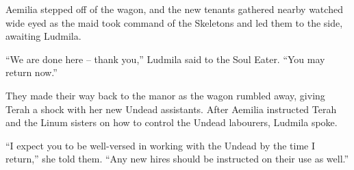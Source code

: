 Aemilia stepped off of the wagon, and the new tenants gathered nearby watched wide eyed as the maid took command of the Skeletons and led them to the side, awaiting Ludmila.

 

“We are done here – thank you,” Ludmila said to the Soul Eater. “You may return now.”

 

They made their way back to the manor as the wagon rumbled away, giving Terah a shock with her new Undead assistants. After Aemilia instructed Terah and the Linum sisters on how to control the Undead labourers, Ludmila spoke.

 

“I expect you to be well-versed in working with the Undead by the time I return,” she told them. “Any new hires should be instructed on their use as well.”